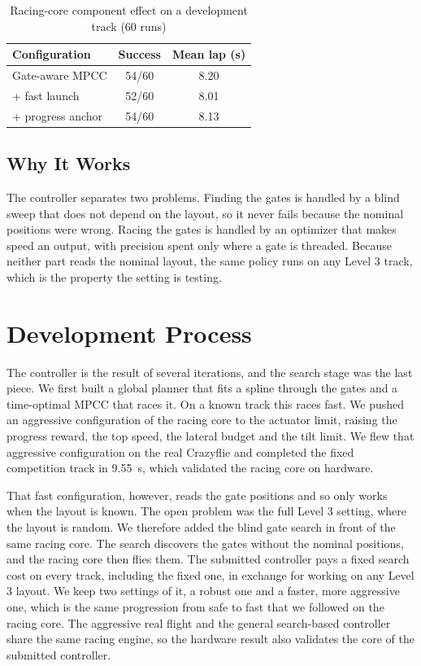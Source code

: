 \documentclass[conference]{IEEEtran}
\begin{document}
\begin{table}[htbp]
\caption{Racing-core component effect on a development track (60 runs)}
\begin{center}
\begin{tabular}{|l|c|c|}
\hline
\textbf{Configuration} & \textbf{Success} & \textbf{Mean lap (s)} \\
\hline
Gate-aware MPCC & 54/60 & 8.20 \\
\hline
+ fast launch & 52/60 & 8.01 \\
\hline
+ progress anchor & 54/60 & 8.13 \\
\hline
\end{tabular}
\label{tab:ablation}
\end{center}
\end{table}

\subsection{Why It Works}
The controller separates two problems. Finding the gates is handled by a blind sweep that does not depend on the layout, so it never fails because the nominal positions were wrong. Racing the gates is handled by an optimizer that makes speed an output, with precision spent only where a gate is threaded. Because neither part reads the nominal layout, the same policy runs on any Level 3 track, which is the property the setting is testing.

\section{Development Process}
\label{sec:process}
The controller is the result of several iterations, and the search stage was the last piece. We first built a global planner that fits a spline through the gates and a time-optimal MPCC that races it. On a known track this races fast. We pushed an aggressive configuration of the racing core to the actuator limit, raising the progress reward, the top speed, the lateral budget and the tilt limit. We flew that aggressive configuration on the real Crazyflie and completed the fixed competition track in 9.55~s, which validated the racing core on hardware.

That fast configuration, however, reads the gate positions and so only works when the layout is known. The open problem was the full Level 3 setting, where the layout is random. We therefore added the blind gate search in front of the same racing core. The search discovers the gates without the nominal positions, and the racing core then flies them. The submitted controller pays a fixed search cost on every track, including the fixed one, in exchange for working on any Level 3 layout. We keep two settings of it, a robust one and a faster, more aggressive one, which is the same progression from safe to fast that we followed on the racing core. The aggressive real flight and the general search-based controller share the same racing engine, so the hardware result also validates the core of the submitted controller.
\end{document}
